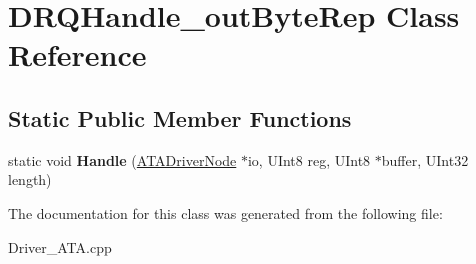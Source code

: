 \hypertarget{class_d_r_q_handle__out_byte_rep}{}\section{D\+R\+Q\+Handle\+\_\+out\+Byte\+Rep Class Reference}
\label{class_d_r_q_handle__out_byte_rep}
\subsection*{Static Public Member Functions}
\begin{DoxyCompactItemize}
\item 
\mbox{\label{class_d_r_q_handle__out_byte_rep_a5f9de061a65251dfd449821a957bfb9f}} 
static void {\bfseries Handle} (\hyperlink{class_a_t_a_driver_node}{A\+T\+A\+Driver\+Node} $\ast$io, U\+Int8 reg, U\+Int8 $\ast$buffer, U\+Int32 length)
\end{DoxyCompactItemize}


The documentation for this class was generated from the following file\+:\begin{DoxyCompactItemize}
\item 
Driver\+\_\+\+A\+T\+A.\+cpp\end{DoxyCompactItemize}
